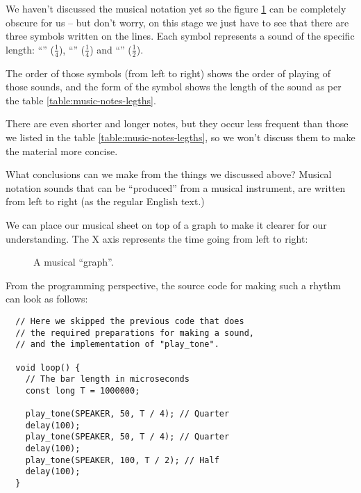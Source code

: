 \documentclass[../sparc.tex]{subfiles}
\begin{document}
We haven't discussed the musical notation yet so the figure
\ref{fig:lilypond-queen-1} can be completely obscure for us -- but don't worry,
on this stage we just have to see that there are three symbols written on the
lines.  Each symbol represents a sound of the specific length: ``\quarterNote''
($\frac{1}{4}$), ``\quarterNote'' ($\frac{1}{4}$) and ``\halfNote''
($\frac{1}{2}$).

The order of those symbols (from left to right) shows the order of playing of
those sounds, and the form of the symbol shows the length of the sound as per
the table \ref{table:music-notes-legths}.


There are even shorter and longer notes, but they occur less frequent than those
we listed in the table \ref{table:music-notes-legths}, so we won't discuss them
to make the material more concise.

What conclusions can we make from the things we discussed above?  Musical
notation sounds that can be ``produced'' from a musical instrument, are written
from left to right (as the regular English text.)

We can place our musical sheet on top of a graph to make it clearer for our
understanding.  The $\mbox{X}$ axis represents the time going from left to
right:

\begin{figure}[ht]
  \centering

  \caption{A musical ``graph''.}
  \label{fig:lilypond-queen-1}
\end{figure}

From the programming perspective, the source code for making such a rhythm can
look as follows:

\begin{verbatim}
  // Here we skipped the previous code that does
  // the required preparations for making a sound,
  // and the implementation of "play_tone".

  void loop() {
    // The bar length in microseconds
    const long T = 1000000;

    play_tone(SPEAKER, 50, T / 4); // Quarter
    delay(100);
    play_tone(SPEAKER, 50, T / 4); // Quarter
    delay(100);
    play_tone(SPEAKER, 100, T / 2); // Half
    delay(100);
  }
\end{verbatim}
\end{document}
